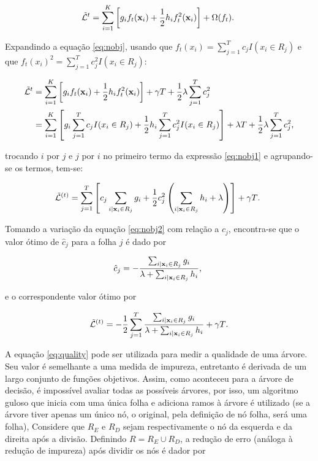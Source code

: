 \begin{equation}\label{eq:nobj}
\mathcal{\tilde{L}}^{t}=\sum_{i=1}^{K}\left[g_if_t({\bf x}_i)+\frac{1}{2}h_if_t^2({\bf x}_i)\right]+\Omega(f_t)\mbox{.}~
\end{equation}

Expandindo a equação \eqref{eq:nobj}, usando que $f_t(x_i)=\sum_{j=1}^{T}c_jI(x_i\in R_j)$ e que $f_t(x_i)^2=\sum_{j=1}^{T}c_j^2I(x_i\in R_j)$:

\begin{align}\label{eq:nobj1}
\mathcal{\tilde{L}}^{t}&=\sum_{i=1}^{K}\left[g_if_t({\bf x}_i)+\frac{1}{2}h_if_t^2({\bf x}_i)\right]+\gamma T + \frac{1}{2}\lambda\sum_{j=1}^Tc_j^2 \\
                       &=\sum_{i=1}^{K}\left[g_i\sum_{j=1}^{T}c_jI(x_i\in R_j)+\frac{1}{2}h_i\sum_{j=1}^{T}c_j^2I(x_i\in R_j)\right]+\lambda{T} + \frac{1}{2}\lambda\sum_{j=1}^Tc_j^2\mbox{,}
\end{align}

trocando $i$ por $j$ e $j$ por $i$ no primeiro termo da expressão \eqref{eq:nobj1} e agrupando-se os termos, tem-se:

\begin{equation}\label{eq:nobj2}
\mathcal{\tilde{L}}^{(t)}=\sum_{j=1}^{T}\left[c_j\sum_{i|{\bf x}_i\in R_j}g_i+\frac{1}{2}c_j^2\left(\sum_{i|{\bf x}_i\in R_j}h_i+\lambda\right)\right]+\gamma{T}\mbox{.}~
\end{equation}

Tomando a variação da equação \eqref{eq:nobj2} com relação a $c_j$, encontra-se que o valor ótimo de  $\hat{c}_j$ para a folha $j$ é dado por

\begin{equation}
\hat{c}_j=-\frac{\sum_{i|{\bf x}_i\in R_j}g_i}{\lambda+\sum_{i|{\bf x}_i\in R_j}h_i}\mbox{,}~
\end{equation}

e o correspondente valor ótimo por

\begin{equation}\label{eq:quality}
\mathcal{\tilde{L}}^{(t)}=-\frac{1}{2}\sum_{j=1}^{T}\frac{\sum_{i|{\bf x}_i\in R_j}g_i}{\lambda+\sum_{i|{\bf x}_i\in R_j}h_i}+\gamma T\mbox{.}
\end{equation}

A equação \eqref{eq:quality} pode ser utilizada para medir a qualidade de uma árvore. Seu valor é semelhante a uma medida de impureza, entretanto é derivada de um largo conjunto de funções objetivos. Assim, como aconteceu para a árvore de decisão, é impossível avaliar todas as possíveis árvores, por isso, um algoritmo guloso que inicia com uma única folha e adiciona ramos à árvore é utilizado (se a árvore tiver apenas um único nó, o original, pela definição de nó folha, será uma folha), Considere que $R_E$ e $R_D$ sejam respectivamente o nó da esquerda e da direita após a divisão. Definindo $R=R_E\cup R_D$, a redução de erro (análoga à redução de impureza) após dividir os nós é dador por

